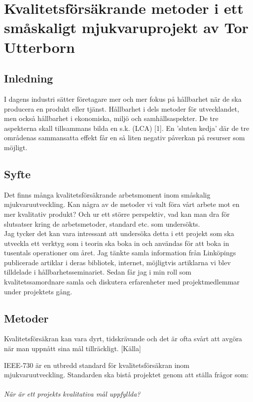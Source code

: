 \chapter{Kvalitetsförsäkrande metoder i ett småskaligt mjukvaruprojekt av Tor Utterborn}


\section{Inledning}
I dagens industri sätter företagare mer och mer fokus på hållbarhet när de ska producera en produkt eller tjänst. Hållbarhet i dels metoder för utvecklandet, men också hållbarhet i ekonomiska, miljö och samhällsaspekter.
De tre aspekterna skall tillsammans bilda en s.k. (LCA) [1]. En ’sluten kedja’ där de tre områdenas sammansatta effekt får en så liten negativ påverkan på resurser som möjligt.

\section{Syfte}
Det finns många kvalitetsförsäkrande arbetsmoment inom småskalig mjukvaruutveckling. Kan några av de metoder vi valt föra vårt arbete mot en mer kvalitativ produkt? Och ur ett större perspektiv, vad kan man dra för slutsatser kring de arbetsmetoder, standard etc. som undersökts. \\
Jag tycker det kan vara intressant att undersöka detta i ett projekt som ska utveckla ett verktyg som i teorin ska boka in och användas för att boka in tusentals operationer om året.
Jag tänkte samla information från Linköpings publicerade artiklar i deras bibliotek, internet, möjligtvis artiklarna vi blev tilldelade i hållbarhetsseminariet. Sedan får jag i min roll som kvalitetssamordnare samla och diskutera erfarenheter med projektmedlemmar under projektets gång.

\section{Metoder}

Kvalitetsförsäkran kan vara dyrt, tidskrävande och det är ofta svårt att avgöra när man uppnått sina mål tillräckligt. [Källa]

IEEE-730 är en utbredd standard för kvalitetsförsäkran inom mjukvaruutveckling. Standarden ska bistå projektet genom att ställa frågor som:
\\ \\
\emph{När är ett projekts kvalitativa mål uppfyllda?}

